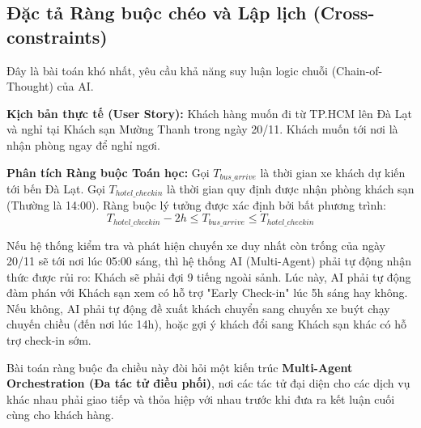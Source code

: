 \subsection{Đặc tả Ràng buộc chéo và Lập lịch (Cross-constraints)}
Đây là bài toán khó nhất, yêu cầu khả năng suy luận logic chuỗi (Chain-of-Thought) của AI. 

\textbf{Kịch bản thực tế (User Story):} Khách hàng muốn đi từ TP.HCM lên Đà Lạt và nghỉ tại Khách sạn Mường Thanh trong ngày 20/11. Khách muốn tới nơi là nhận phòng ngay để nghỉ ngơi.

\textbf{Phân tích Ràng buộc Toán học:} 
Gọi $T_{bus\_arrive}$ là thời gian xe khách dự kiến tới bến Đà Lạt. 
Gọi $T_{hotel\_checkin}$ là thời gian quy định được nhận phòng khách sạn (Thường là 14:00). 
Ràng buộc lý tưởng được xác định bởi bất phương trình:
\begin{equation}
    T_{hotel\_checkin} - 2h \leq T_{bus\_arrive} \leq T_{hotel\_checkin}
\end{equation}

Nếu hệ thống kiểm tra và phát hiện chuyến xe duy nhất còn trống của ngày 20/11 sẽ tới nơi lúc 05:00 sáng, thì hệ thống AI (Multi-Agent) phải tự động nhận thức được rủi ro: Khách sẽ phải đợi 9 tiếng ngoài sảnh. Lúc này, AI phải tự động đàm phán với Khách sạn xem có hỗ trợ "Early Check-in" lúc 5h sáng hay không. Nếu không, AI phải tự động đề xuất khách chuyển sang chuyến xe buýt chạy chuyến chiều (đến nơi lúc 14h), hoặc gợi ý khách đổi sang Khách sạn khác có hỗ trợ check-in sớm.

Bài toán ràng buộc đa chiều này đòi hỏi một kiến trúc \textbf{Multi-Agent Orchestration (Đa tác tử điều phối)}, nơi các tác tử đại diện cho các dịch vụ khác nhau phải giao tiếp và thỏa hiệp với nhau trước khi đưa ra kết luận cuối cùng cho khách hàng.

